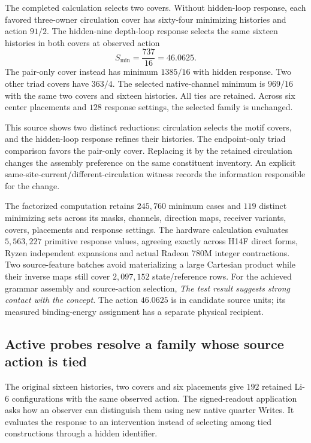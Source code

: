 The completed calculation selects two covers. Without hidden-loop response, each favored three-owner circulation cover has sixty-four minimizing histories and action $91/2$. The hidden-nine depth-loop response selects the same sixteen histories in both covers at observed action
\[
 S_{\min}=\frac{737}{16}=46.0625.
\]
The pair-only cover instead has minimum $1385/16$ with hidden response. Two other triad covers have $363/4$. The selected native-channel minimum is $969/16$ with the same two covers and sixteen histories. All ties are retained. Across six center placements and $128$ response settings, the selected family is unchanged.

This source shows two distinct reductions: circulation selects the motif covers, and the hidden-loop response refines their histories. The endpoint-only triad comparison favors the pair-only cover. Replacing it by the retained circulation changes the assembly preference on the same constituent inventory. An explicit same-site-current/different-circulation witness records the information responsible for the change.

The factorized computation retains $245{,}760$ minimum cases and $119$ distinct minimizing sets across its masks, channels, direction maps, receiver variants, covers, placements and response settings. The hardware calculation evaluates $5{,}563{,}227$ primitive response values, agreeing exactly across H14F direct forms, Ryzen independent expansions and actual Radeon 780M integer contractions. Two source-feature batches avoid materializing a large Cartesian product while their inverse maps still cover $2{,}097{,}152$ state/reference rows. For the achieved grammar assembly and source-action selection, \emph{The test result suggests strong contact with the concept.} The action $46.0625$ is in candidate source units; its measured binding-energy assignment has a separate physical recipient.

\subsection{Active probes resolve a family whose source action is tied}

The original sixteen histories, two covers and six placements give $192$ retained Li-6 configurations with the same observed action. The signed-readout application asks how an observer can distinguish them using new native quarter Writes. It evaluates the response to an intervention instead of selecting among tied constructions through a hidden identifier. 

